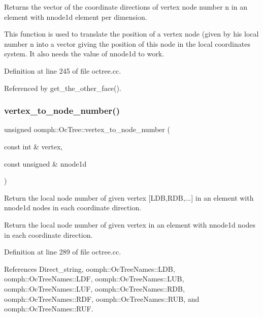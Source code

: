 Returns the vector of the coordinate directions of vertex node number n in an element with nnode1d element per dimension. 

This function is used to translate the position of a vertex node (given by his local number n into a vector giving the position of this node in the local coordinates system. It also needs the value of nnode1d to work. 

Definition at line 245 of file octree.\+cc.



Referenced by get\+\_\+the\+\_\+other\+\_\+face().

\mbox{\label{classoomph_1_1OcTree_af2a129b95ad303ed340bb8bd86e05384}} 
\subsubsection{\texorpdfstring{vertex\+\_\+to\+\_\+node\+\_\+number()}{vertex\_to\_node\_number()}}
{\footnotesize\ttfamily unsigned oomph\+::\+Oc\+Tree\+::vertex\+\_\+to\+\_\+node\+\_\+number (\begin{DoxyParamCaption}\item[{const int \&}]{vertex,  }\item[{const unsigned \&}]{nnode1d }\end{DoxyParamCaption})\hspace{0.3cm}{\ttfamily [static]}}



Return the local node number of given vertex \mbox{[}L\+DB,R\+DB,...\mbox{]} in an element with nnode1d nodes in each coordinate direction. 

Return the local node number of given vertex in an element with nnode1d nodes in each coordinate direction. 

Definition at line 289 of file octree.\+cc.



References Direct\+\_\+string, oomph\+::\+Oc\+Tree\+Names\+::\+L\+DB, oomph\+::\+Oc\+Tree\+Names\+::\+L\+DF, oomph\+::\+Oc\+Tree\+Names\+::\+L\+UB, oomph\+::\+Oc\+Tree\+Names\+::\+L\+UF, oomph\+::\+Oc\+Tree\+Names\+::\+R\+DB, oomph\+::\+Oc\+Tree\+Names\+::\+R\+DF, oomph\+::\+Oc\+Tree\+Names\+::\+R\+UB, and oomph\+::\+Oc\+Tree\+Names\+::\+R\+UF.




